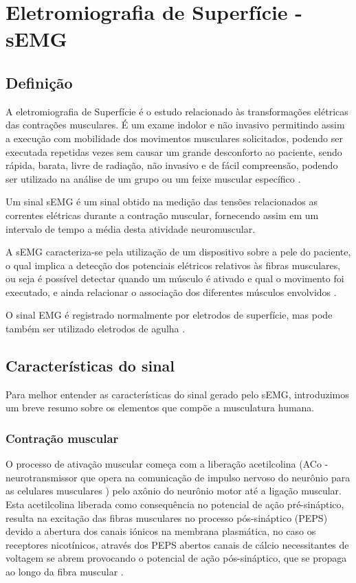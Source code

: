 \chapter{Eletromiografia de Superfície - sEMG}
\section{Definição}
A eletromiografia de Superfície é o estudo relacionado às transformações elétricas das contrações musculares. É um exame indolor e não invasivo permitindo assim a execução com mobilidade dos movimentos musculares solicitados, podendo ser executada repetidas vezes sem causar um grande desconforto ao paciente, sendo rápida, barata, livre de radiação, não invasivo e de fácil compreensão, podendo ser utilizado na análise de um grupo ou um feixe muscular específico \cite{de2010eletromiografia}.

Um sinal sEMG é um sinal obtido na medição das tensões relacionados as correntes elétricas durante a contração muscular, fornecendo assim em um intervalo de tempo a média desta atividade neuromuscular\cite{reaz2006techniques}.

A sEMG caracteriza-se pela utilização de um dispositivo sobre a pele do paciente, o qual implica a detecção dos potenciais elétricos relativos às fibras musculares, ou seja é possível detectar quando um músculo é ativado e qual o movimento foi executado, e ainda relacionar o associação dos diferentes músculos envolvidos \cite{botelho2010avaliaccao}.

O sinal EMG é registrado normalmente por eletrodos de superfície, mas pode também ser utilizado eletrodos de agulha \cite{eftaxias2015detection}.

\section{Características do sinal}
Para melhor entender as características do sinal gerado pelo sEMG, introduzimos um breve resumo sobre os elementos que compõe a musculatura humana.

\subsection{Contração muscular}
O processo de ativação muscular começa com a liberação acetilcolina (ACo - neurotransmissor que opera na comunicação de impulso nervoso do neurônio para as celulares musculares \cite{flores2005estructura}) pelo axônio do neurônio motor até a ligação muscular. Esta acetilcolina liberada como consequência no potencial de ação pré-sináptico, resulta na excitação das fibras musculares no processo pós-sináptico (PEPS) devido a abertura dos canais iónicos na membrana plasmática, no caso os receptores nicotínicos, através dos PEPS abertos canais de cálcio necessitantes de voltagem se abrem provocando o potencial de ação pós-sináptico, que se propaga ao longo da fibra muscular \cite{da2005detecccao}.

